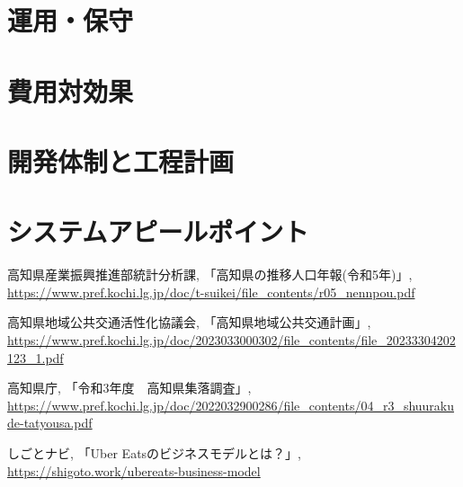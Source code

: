 \documentclass{jlreq}
\begin{document}
\section{運用・保守}


\section{費用対効果}


\section{開発体制と工程計画}


\section{システムアピールポイント}


\begin{thebibliography}{9}

高知県産業振興推進部統計分析課,
「高知県の推移人口年報(令和5年)」,
\url{https://www.pref.kochi.lg.jp/doc/t-suikei/file_contents/r05_nennpou.pdf}

高知県地域公共交通活性化協議会,
「高知県地域公共交通計画」,
\url{https://www.pref.kochi.lg.jp/doc/2023033000302/file_contents/file_20233304202123_1.pdf}

高知県庁,
「令和3年度　高知県集落調査」,
\url{https://www.pref.kochi.lg.jp/doc/2022032900286/file_contents/04_r3_shuurakude-tatyousa.pdf}

しごとナビ,
「Uber Eatsのビジネスモデルとは？」,
\url{https://shigoto.work/ubereats-business-model}

\end{thebibliography}
\end{document}
